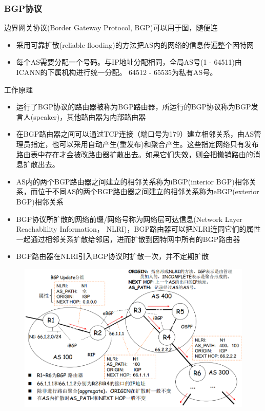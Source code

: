 \subsubsection{BGP协议}
边界网关协议(Border Gateway Protocol, BGP)可以用于图，随便连

\begin{itemize}
\item 采用可靠扩散(reliable flooding)的方法把AS内的网络的信息传遍整个因特网
\item 每个AS需要分配一个号码。与IP地址分配相同，全局AS号(1 - 64511)由ICANN的下属机构进行统一分配。 64512 - 65535为私有AS号。
\end{itemize}

工作原理
\begin{itemize}
\item 运行了BGP协议的路由器被称为BGP路由器，所运行的BGP协议称为BGP发言人(speaker)，其他路由器为内部路由器
\item 在BGP路由器之间可以通过TCP连接（端口号为179）建立相邻关系，由AS管理员指定，也可以采用自动产生(重发布)和聚合产生。这些指定网络只有发布路由表中存在才会被改路由器扩散出去。如果它们失效，则会把撤销路由的消息扩散出去。
\item AS内的两个BGP路由器之间建立的相邻关系称为iBGP(interior BGP)相邻关系，而位于不同AS的两个BGP路由器之间建立的相邻关系称为eBGP(exterior BGP)相邻关系
\item  BGP协议所扩散的网络前缀/网络号称为网络层可达信息(Network Layer Reachablility Information， NLRI)，BGP路由器可以把NLRI连同它们的属性一起通过相邻关系扩散给邻居，进而扩散到因特网中所有的BGP路由器
\item BGP路由器在NLRI引入BGP协议时扩散一次，并不定期扩散
\end{itemize}
\begin{figure}[H]
	\centering
	\includegraphics[width=0.8\linewidth]{fig/NLRI.png}
\end{figure}

